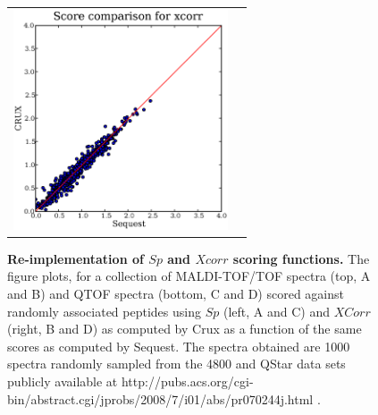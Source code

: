 \documentclass{article}
\begin{document}
\begin{figure}
\begin{tabular}{ll}
    \includegraphics[width=2.5in]{../../results/paper-figure/second-score/QSTAR/fig-2-random-xcorr.eps} \\

  \end{tabular}
  \caption{{\bf Re-implementation of $Sp$ and $Xcorr$ scoring functions.}
  The figure plots, for a collection of MALDI-TOF/TOF spectra (top, {\sf A}
  and {\sf B}) and QTOF spectra (bottom, {\sc C} and {\sc D}) scored against 
  randomly associated peptides using $Sp$ (left, {\sf A} and {\sf C}) and 
  $XCorr$ (right, {\sf B} and {\sf D}) 
  as computed by Crux as a function of the
  same scores as computed by {\sc Sequest}. The spectra obtained 
  are 1000 spectra randomly sampled from the 4800 and QStar data sets
  publicly available at 
  http://pubs.acs.org/cgi-bin/abstract.cgi/jprobs/2008/7/i01/abs/pr070244j.html
 \citep{klimek:standard}.
  \label{figure:sp-xcorr-random}}
\end{figure}
\end{document}

